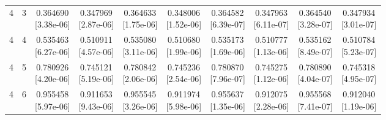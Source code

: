 \documentclass[12pt,letterpaper]{article}
\theoremstyle{plain}
\theoremstyle{definition}
\begin{document}
\begin{table}[p]
\begin{adjustbox}{max width=\linewidth}
\begin{tabular}{@{}rr*{8}{c}@{}}
4 & 3 & \shortstack{0.364690\\[-1pt]{\scriptsize[3.38e-06]}} & \shortstack{0.347969\\[-1pt]{\scriptsize[2.87e-06]}} & \shortstack{0.364633\\[-1pt]{\scriptsize[1.75e-06]}} & \shortstack{0.348006\\[-1pt]{\scriptsize[1.52e-06]}} & \shortstack{0.364582\\[-1pt]{\scriptsize[6.39e-07]}} & \shortstack{0.347963\\[-1pt]{\scriptsize[6.11e-07]}} & \shortstack{0.364540\\[-1pt]{\scriptsize[3.28e-07]}} & \shortstack{0.347934\\[-1pt]{\scriptsize[3.01e-07]}}\\
4 & 4 & \shortstack{0.535463\\[-1pt]{\scriptsize[6.27e-06]}} & \shortstack{0.510911\\[-1pt]{\scriptsize[4.57e-06]}} & \shortstack{0.535080\\[-1pt]{\scriptsize[3.11e-06]}} & \shortstack{0.510680\\[-1pt]{\scriptsize[1.99e-06]}} & \shortstack{0.535173\\[-1pt]{\scriptsize[1.69e-06]}} & \shortstack{0.510777\\[-1pt]{\scriptsize[1.13e-06]}} & \shortstack{0.535162\\[-1pt]{\scriptsize[8.49e-07]}} & \shortstack{0.510784\\[-1pt]{\scriptsize[5.23e-07]}}\\
4 & 5 & \shortstack{0.780926\\[-1pt]{\scriptsize[4.20e-06]}} & \shortstack{0.745121\\[-1pt]{\scriptsize[5.19e-06]}} & \shortstack{0.780842\\[-1pt]{\scriptsize[2.06e-06]}} & \shortstack{0.745236\\[-1pt]{\scriptsize[2.54e-06]}} & \shortstack{0.780870\\[-1pt]{\scriptsize[7.96e-07]}} & \shortstack{0.745275\\[-1pt]{\scriptsize[1.12e-06]}} & \shortstack{0.780890\\[-1pt]{\scriptsize[4.04e-07]}} & \shortstack{0.745318\\[-1pt]{\scriptsize[4.95e-07]}}\\
4 & 6 & \shortstack{0.955458\\[-1pt]{\scriptsize[5.97e-06]}} & \shortstack{0.911653\\[-1pt]{\scriptsize[9.43e-06]}} & \shortstack{0.955545\\[-1pt]{\scriptsize[3.26e-06]}} & \shortstack{0.911974\\[-1pt]{\scriptsize[5.98e-06]}} & \shortstack{0.955637\\[-1pt]{\scriptsize[1.35e-06]}} & \shortstack{0.912075\\[-1pt]{\scriptsize[2.28e-06]}} & \shortstack{0.955568\\[-1pt]{\scriptsize[7.41e-07]}} & \shortstack{0.912040\\[-1pt]{\scriptsize[1.19e-06]}}\\

\end{tabular}
\end{adjustbox}
\end{table}
\end{document}
